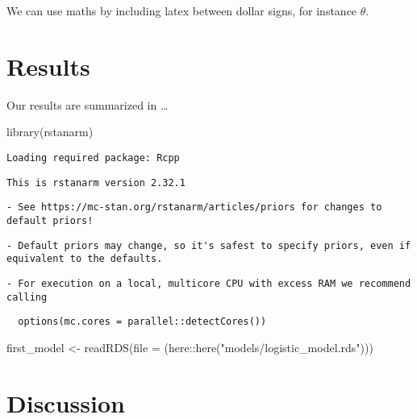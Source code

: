 \documentclass[
  letterpaper,
  DIV=11,
  numbers=noendperiod]{scrartcl}
\newenvironment{Shaded}{\begin{snugshade}}{\end{snugshade}}
\newcommand{\AttributeTok}[1]{\textcolor[rgb]{0.40,0.45,0.13}{#1}}
\newcommand{\FunctionTok}[1]{\textcolor[rgb]{0.28,0.35,0.67}{#1}}
\newcommand{\NormalTok}[1]{\textcolor[rgb]{0.00,0.23,0.31}{#1}}
\newcommand{\OtherTok}[1]{\textcolor[rgb]{0.00,0.23,0.31}{#1}}
\newcommand{\SpecialCharTok}[1]{\textcolor[rgb]{0.37,0.37,0.37}{#1}}
\newcommand{\StringTok}[1]{\textcolor[rgb]{0.13,0.47,0.30}{#1}}
\begin{document}
We can use maths by including latex between dollar signs, for instance
\(\theta\).

\section{Results}\label{results}

Our results are summarized in \ldots{}

\begin{Shaded}
\begin{Highlighting}[]
\FunctionTok{library}\NormalTok{(rstanarm)}
\end{Highlighting}
\end{Shaded}

\begin{verbatim}
Loading required package: Rcpp
\end{verbatim}

\begin{verbatim}
This is rstanarm version 2.32.1
\end{verbatim}

\begin{verbatim}
- See https://mc-stan.org/rstanarm/articles/priors for changes to default priors!
\end{verbatim}

\begin{verbatim}
- Default priors may change, so it's safest to specify priors, even if equivalent to the defaults.
\end{verbatim}

\begin{verbatim}
- For execution on a local, multicore CPU with excess RAM we recommend calling
\end{verbatim}

\begin{verbatim}
  options(mc.cores = parallel::detectCores())
\end{verbatim}

\begin{Shaded}
\begin{Highlighting}[]
\NormalTok{first\_model }\OtherTok{\textless{}{-}}
  \FunctionTok{readRDS}\NormalTok{(}\AttributeTok{file =}\NormalTok{ (here}\SpecialCharTok{::}\FunctionTok{here}\NormalTok{(}\StringTok{"models/logistic\_model.rds"}\NormalTok{)))}
\end{Highlighting}
\end{Shaded}

\section{Discussion}\label{discussion}
\end{document}
